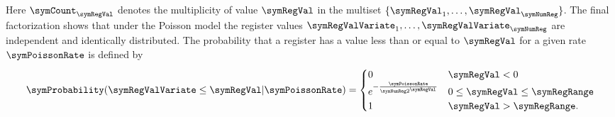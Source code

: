 \documentclass[a4paper]{scrartcl}
\begin{document}
Here $\symCount_\symRegVal$ denotes the multiplicity of value $\symRegVal$  in the multiset $\lbrace\symRegVal_1,\ldots,\symRegVal_\symNumReg\rbrace$.
The final factorization shows that under the Poisson model the register values $\symRegValVariate_1,\ldots,\symRegValVariate_\symNumReg$ are independent and identically distributed. The probability that a register has a value less than or equal to $\symRegVal$ for a given rate $\symPoissonRate$ is defined by
\begin{equation}
\label{equ:register_value_distribution}
\symProbability(\symRegValVariate \leq \symRegVal\vert\symPoissonRate)
=
\begin{cases}
0 & \symRegVal < 0 \\
e^{-\frac{\symPoissonRate}{\symNumReg 2^\symRegVal}} & 0\leq \symRegVal \leq \symRegRange \\
1 & \symRegVal > \symRegRange.
\end{cases}
\end{equation}
\end{document}
